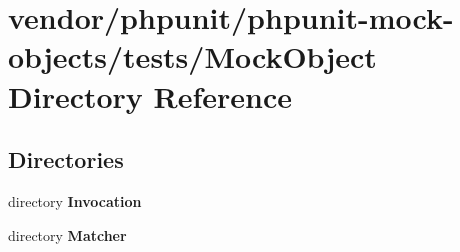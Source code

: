 \section{vendor/phpunit/phpunit-\/mock-\/objects/tests/\+Mock\+Object Directory Reference}
\label{dir_f2840d55b07ee78cf2750034697e80ea}
\subsection*{Directories}
\begin{DoxyCompactItemize}
\item 
directory {\bf Invocation}
\item 
directory {\bf Matcher}
\end{DoxyCompactItemize}
